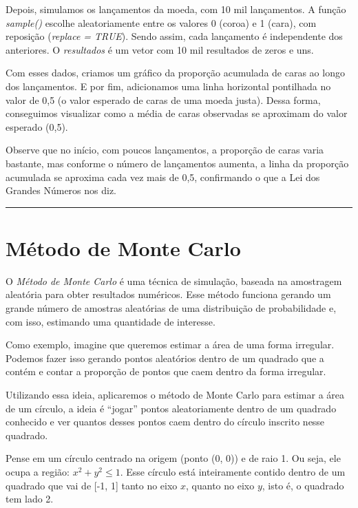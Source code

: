 \documentclass[
]{book}
\begin{document}
Depois, simulamos os lançamentos da moeda, com 10 mil lançamentos. A função \emph{sample()} escolhe aleatoriamente entre os valores 0 (coroa) e 1 (cara), com reposição (\emph{replace = TRUE}). Sendo assim, cada lançamento é independente dos anteriores. O \emph{resultados} é um vetor com 10 mil resultados de zeros e uns.

Com esses dados, criamos um gráfico da proporção acumulada de caras ao longo dos lançamentos. E por fim, adicionamos uma linha horizontal pontilhada no valor de 0,5 (o valor esperado de caras de uma moeda justa). Dessa forma, conseguimos visualizar como a média de caras observadas se aproximam do valor esperado (0,5).

Observe que no início, com poucos lançamentos, a proporção de caras varia bastante, mas conforme o número de lançamentos aumenta, a linha da proporção acumulada se aproxima cada vez mais de 0,5, confirmando o que a Lei dos Grandes Números nos diz.

\begin{center}\rule{0.5\linewidth}{0.5pt}\end{center}

\section{Método de Monte Carlo}\label{muxe9todo-de-monte-carlo}

O \emph{Método de Monte Carlo} é uma técnica de simulação, baseada na amostragem aleatória para obter resultados numéricos. Esse método funciona gerando um grande número de amostras aleatórias de uma distribuição de probabilidade e, com isso, estimando uma quantidade de interesse.

Como exemplo, imagine que queremos estimar a área de uma forma irregular. Podemos fazer isso gerando pontos aleatórios dentro de um quadrado que a contém e contar a proporção de pontos que caem dentro da forma irregular.

Utilizando essa ideia, aplicaremos o método de Monte Carlo para estimar a área de um círculo, a ideia é ``jogar'' pontos aleatoriamente dentro de um quadrado conhecido e ver quantos desses pontos caem dentro do círculo inscrito nesse quadrado.

Pense em um círculo centrado na origem (ponto (0, 0)) e de raio 1. Ou seja, ele ocupa a região: \(x^2 + y^2 \leq 1\). Esse círculo está inteiramente contido dentro de um quadrado que vai de {[}-1, 1{]} tanto no eixo \(x\), quanto no eixo \(y\), isto é, o quadrado tem lado 2.
\end{document}

